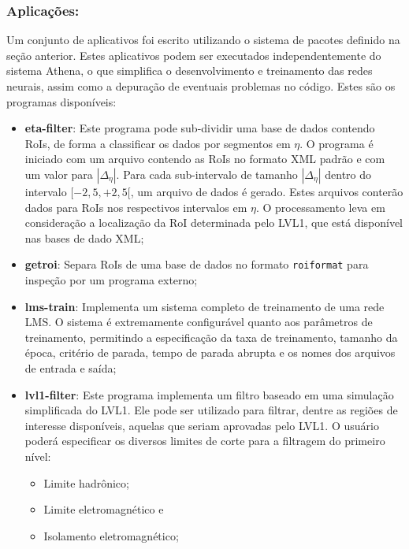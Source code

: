 \subsubsection{Aplicações:}

Um conjunto de aplicativos foi escrito utilizando o sistema de pacotes
definido na seção anterior. Estes aplicativos podem ser executados
independentemente do sistema Athena, o que simplifica o desenvolvimento e
treinamento das redes neurais, assim como a depuração de eventuais problemas
no código. Estes são os programas disponíveis:

\begin{itemize}

\item \textbf{eta-filter}: Este programa pode sub-dividir uma base de dados
contendo RoIs, de forma a classificar os dados por segmentos em $\eta$. O
programa é iniciado com um arquivo contendo as RoIs no formato XML padrão e
com um valor para $|\Delta_\eta|$. Para cada sub-intervalo de tamanho
$|\Delta_\eta|$ dentro do intervalo $[-2,5, +2,5[$, um arquivo de dados é
gerado. Estes arquivos conterão dados para RoIs nos respectivos intervalos em
$\eta$. O processamento leva em consideração a localização da RoI determinada
pelo LVL1, que está disponível nas bases de dado XML;

\item \textbf{getroi}: Separa RoIs de uma base de dados no formato
\texttt{roiformat} para inspeção por um programa externo;

\item \textbf{lms-train}: Implementa um sistema completo de treinamento 
de uma rede LMS. O sistema é extremamente configurável quanto aos parâmetros de
treinamento, permitindo a especificação da taxa de treinamento, tamanho da
época, critério de parada, tempo de parada abrupta e os nomes dos arquivos de
entrada e saída;

\item \textbf{lvl1-filter}: Este programa implementa um filtro baseado em uma
simulação simplificada do LVL1. Ele pode ser utilizado para filtrar, dentre as
regiões de interesse disponíveis, aquelas que seriam aprovadas pelo LVL1. O
usuário poderá especificar os diversos limites de corte para a filtragem do
primeiro nível:

\begin{itemize}
\item Limite hadrônico;
\item Limite eletromagnético e
\item Isolamento eletromagnético;
\end{itemize}


\end{itemize}
